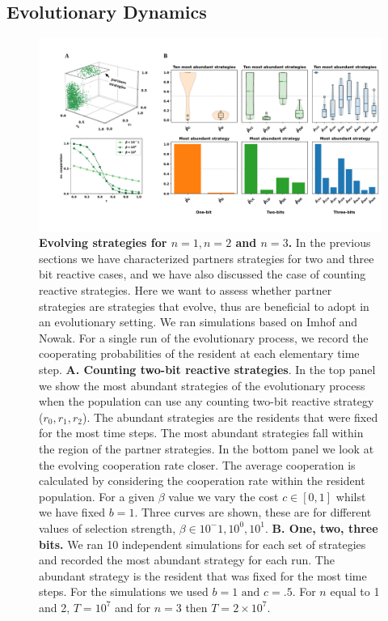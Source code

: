 \documentclass{article}
\theoremstyle{definition}
\begin{document}
\subsection{Evolutionary Dynamics}

\begin{figure}[h!]
  \centering
  \includegraphics[width=\textwidth]{figures/evolutionary_dynamics_one_two_three.pdf}
  \caption{\textbf{Evolving strategies for $n=1, n=2$ and $n=3$.} In the previous sections we have
  characterized partners strategies for two and three bit reactive cases, and we
  have also discussed the case of counting reactive strategies. Here we want to
  assess whether partner strategies are strategies that evolve, thus are beneficial to
  adopt in an evolutionary setting. We ran simulations based on Imhof and Nowak.
  For a single run of the evolutionary process, we record the cooperating
  probabilities of the resident at each elementary time step. \textbf{A. Counting
  two-bit reactive strategies}. In the top panel we show the most abundant
  strategies of the evolutionary process when the population can use any
  counting two-bit reactive strategy ($r_0, r_1, r_2$). The abundant
  strategies are the residents that were fixed for the most time steps.
  The most abundant strategies fall within the region of the partner strategies.
  In the bottom panel we look at the evolving cooperation rate closer. The
  average cooperation is calculated by considering the cooperation rate within
  the resident population. For a given $\beta$ value we vary the cost $c \in [0, 1]$
  whilst we have fixed $b=1$. Three curves are shown, these are for different values
  of selection strength, $\beta \in {10^-1, 10^0, 10^1}$.
  \textbf{B. One, two, three bits.} We ran 10 independent simulations for each
  set of strategies and recorded the most abundant strategy for each run. The
  abundant strategy is the resident that was fixed for the most time steps. For
  the simulations we used \(b=1 \text{ and } c=.5\). For $n$ equal to 1 and
  2, \(T= 10 ^ 7\) and for $n=3$ then \(T= 2 \times10 ^ 7\).}
\end{figure}
\end{document}
